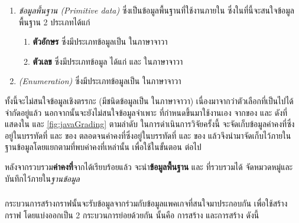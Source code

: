\begin{enumerate}
    \item {\it ข้อมูลพื้นฐาน (Primitive data)} ซึ่งเป็นข้อมูลพื้นฐานที่ใช้งานภายใน{\class} ซึ่งในที่นี้จะสนใจข้อมูลพื้นฐาน 2 ประเภทได้แก่
        \begin{enumerate}
            \item {\bf ตัวอักษร} ซึ่งมีประเภทข้อมูลเป็น  ในภาษาจาวา
            \item {\bf ตัวเลข} ซึ่งมีประเภทข้อมูล ได้แก่  และ ในภาษาจาวา
        \end{enumerate}
    \item {\it {\enum} (Enumeration)} ซึ่งมีประเภทข้อมูลเป็น  ในภาษาจาวา
\end{enumerate}

ทั้งนี้จะไม่สนใจข้อมูลเชิงตรรกะ (มีชนิดข้อมูลเป็น  ในภาษาจาวา) เนื่องมาจากว่าตัวเลือกที่เป็นไปได้จำกัดอยู่แล้ว 
นอกจากนั้นจะยังไม่สนใจข้อมูลจำเพาะ ที่กำหนดขึ้นมาใช้งานเอง 
จาก{\sourcecode}ของ{\class}  และ ดังที่แสดงใน 
 และ \ref{fig:javaGrading} ตามลำดับ ในการดำเนินการวิจัยครั้งนี้ 
จะจัดเก็บข้อมูลค่าคงที่ซึ่งอยู่ในบรรทัดที่  และ  ของ{\class} 
ตลอดจนค่าคงที่ซึ่งอยู่ในบรรทัดที่  และ  ของ{\class}  
แล้วจึงนำมาจัดเก็บไว้ภายในฐานข้อมูลโดยแยกตาม{\class}ที่พบค่าคงที่เหล่านั้น เพื่อใช้ในขั้นตอน {\bf \testcaseGeneration} ต่อไป

หลังจากรวบรวม{\bf ค่าคงที่}จาก{\sourcecode}ได้เรียบร้อยแล้ว จะนำ{\bf ข้อมูลพื้นฐาน} และ{\bf {\enum}} ที่รวบรวมได้
จัดหมวดหมู่และบันทึกไว้ภายใน{\it ฐานข้อมูล}

\subsubsection{\graphCreation}
\label{sec:sub:sub:graphCreation}

กระบวนการสร้างกราฟนั้นจะรับข้อมูล{\sourcecode}จาก{\Repository}ร่วมกับข้อมูลแพคเกจที่{\tester}สนใจมาประกอบกัน 
เพื่อใช้สร้างกราฟ โดยแบ่งออกเป็น 2 กระบวนการย่อยด้วยกัน 
นั้นคือ การสร้าง{\scg} และการสร้าง{\cfg} ดังนี้

